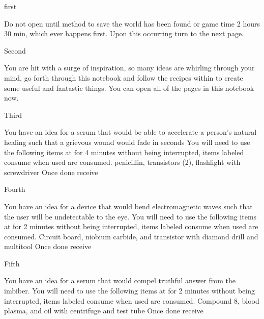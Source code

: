 \documentclass[greennotebook]{guildcamp3} %
\begin{document}
\startnotebook{\nSciOneRecipes{}}

\begin{page}{first}
	
	Do not open until method to save the world has been found or game time 2 hours 30 min, which ever happens first. Upon this occurring turn to the next page.
	
\end{page}

\begin{page}{Second}
	
	You are hit with a surge of inspiration, so many ideas are whirling through your mind, go forth through this notebook and follow the recipes within to create some useful and fantastic things. You can open all of the pages in this notebook now.
	
\end{page}

\begin{page}{Third}
	
	You have an idea for a serum that would be able to accelerate a person's natural healing such that a grievous wound would fade in seconds
	You will need to use the following items at \sSciWorkbench{} for 4 minutes without being interrupted, items labeled consume when used are consumed.
	penicillin, transistors (2), flashlight with screwdriver
	Once done receive \iHealthRemedy{}
	
\end{page}

\begin{page}{Fourth}
	
	You have an idea for a device that would bend electromagnetic waves such that the user will be undetectable to the eye.
	You will need to use the following items at \sSciWorkbench{} for 2 minutes without being interrupted, items labeled consume when used are consumed.
	Circuit board, niobium carbide, and transistor with diamond drill and multitool
	Once done receive \iCloakingDevice{}
	
\end{page}

\begin{page}{Fifth}
	
	You have an idea for a serum that would compel truthful answer from the imbiber.
	You will need to use the following items at \sSciWorkbench{} for 2 minutes without being interrupted, items labeled consume when used are consumed.
	Compound 8, blood plasma, and oil with centrifuge and test tube
	Once done receive \iTruthSerum{}
	
\end{page}
\end{document}
